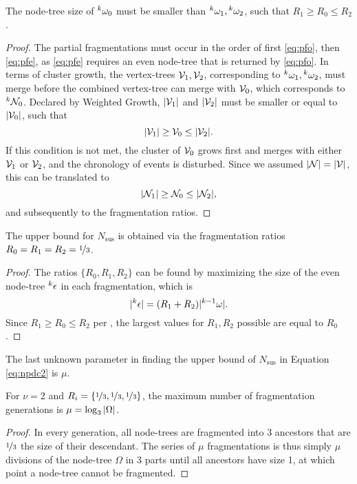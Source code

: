 \begin{lemma}\label{lem:chrono}
  The node-tree size of ${}^{k}\omega_0$ must be smaller than ${}^{k}\omega_1, {}^{k}\omega_2$, such that $R_1 \geq R_0 \leq R_2$. 
\end{lemma}
\begin{proof}
  The partial fragmentations must occur in the order of first \eqref{eq:pfo}, then \eqref{eq:pfe}, as \eqref{eq:pfe} requires an even node-tree that is returned by \eqref{eq:pfo}. In terms of cluster growth, the vertex-trees $\mathcal{V}_1, \mathcal{V}_2$, corresponding to ${}^{k}\omega_1, {}^{k}\omega_2$, must merge before the combined vertex-tree can merge with $\mathcal{V}_0$, which corresponds to ${}^{k}\mathcal{N}_0$. Declared by Weighted Growth, $\lvert\mathcal{V}_1\rvert$ and $\lvert\mathcal{V}_2\rvert$ must be smaller or equal to $\lvert\mathcal{V}_0\rvert$, such that 
  \begin{equation*}
    \lvert\mathcal{V}_1\rvert\geq \mathcal{V}_0 \leq\lvert\mathcal{V}_2\rvert.
  \end{equation*}
  If this condition is not met, the cluster of $\mathcal{V}_0$ grows first and merges with either $\mathcal{V}_1$ or $\mathcal{V}_2$, and the chronology of events is disturbed. Since we assumed $\lvert\mathcal{N}\rvert=\lvert\mathcal{V}\rvert$, this can be translated to 
  \begin{equation*}
    \lvert\mathcal{N}_1\rvert\geq \mathcal{N}_0 \leq\lvert\mathcal{N}_2\rvert,
  \end{equation*}
  and subsequently to the fragmentation ratios.
\end{proof}

\begin{theorem}\label{the:ratios}
  The upper bound for $N_{\text{sus}}$ is obtained via the fragmentation ratios $R_0 = R_1 = R_2 = \nicefrac{1}{3}$.
\end{theorem}
\begin{proof}
  The ratios $\{R_0, R_1, R_2\}$ can be found by maximizing the size of the even node-tree ${}^{k}\epsilon$ in each fragmentation, which is 
  \begin{equation*}
    \lvert{}^{k}\epsilon\rvert = (R_1 + R_2)\lvert{}^{k-1}\omega\rvert.
  \end{equation*}
  Since $ R_1 \geq R_0 \leq R_2$ per , the largest values for $R_1, R_2$ possible are equal to $R_0$.
\end{proof}

The last unknown parameter in finding the upper bound of $N_{\text{sus}}$ in Equation \eqref{eq:npdc2} is $\mu$.

\begin{theorem}\label{the:km}
  For $\nu = 2$ and $R_i = \{\nicefrac{1}{3},\nicefrac{1}{3},\nicefrac{1}{3}\}$, the maximum number of fragmentation generations is $\mu = \log_3{\lvert\Omega\rvert}$.
\end{theorem}
\begin{proof}
  In every generation, all node-trees are fragmented into 3 ancestors that are $\nicefrac{1}{3}$ the size of their descendant. The series of $\mu$ fragmentations is thus simply $\mu$ divisions of the node-tree $\Omega$ in 3 parts until all ancestors have size 1, at which point a node-tree cannot be fragmented.
\end{proof}

